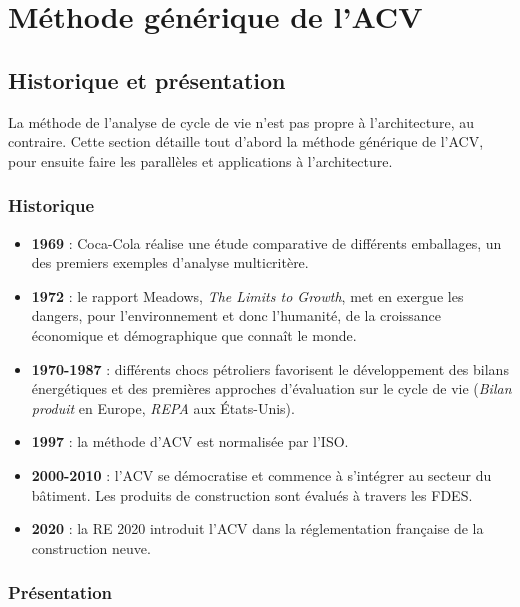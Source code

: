 \part{Méthode générique de l'ACV}

\chapter{Historique et présentation}
La méthode de l'analyse de cycle de vie n'est pas propre à l'architecture, au contraire. Cette section détaille tout d'abord la méthode générique de l'ACV, pour ensuite faire les parallèles et applications à l'architecture.
\section{Historique}

\begin{itemize}
  \item \textbf{1969} : Coca-Cola réalise une étude comparative de différents emballages, un des premiers exemples d'analyse multicritère.
  \item \textbf{1972} : le rapport Meadows, \textit{The Limits to Growth}, met en exergue les dangers, pour l'environnement et donc l'humanité, de la croissance économique et démographique que connaît le monde.
  \item \textbf{1970-1987} : différents chocs pétroliers favorisent le développement des bilans énergétiques et des premières approches d'évaluation sur le cycle de vie (\textit{Bilan produit} en Europe, \textit{REPA} aux États-Unis).
  \item \textbf{1997} : la méthode d'ACV est normalisée par l'ISO.
  \item \textbf{2000-2010} : l'ACV se démocratise et commence à s'intégrer au secteur du bâtiment. Les produits de construction sont évalués à travers les FDES.
  \item \textbf{2020} : la RE 2020 introduit l'ACV dans la réglementation française de la construction neuve.
\end{itemize}

\section{Présentation}

